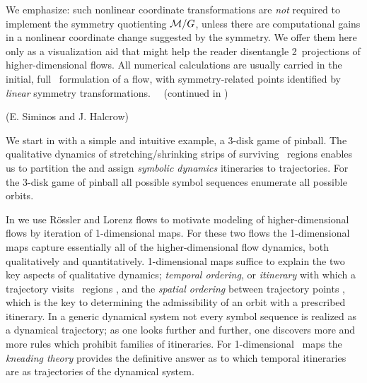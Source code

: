 {We emphasize: such nonlinear coordinate transformations are
\emph{not} required to implement the symmetry quotienting
${\cal M}/G$, unless there are computational gains in a nonlinear
coordinate change suggested by the symmetry. We offer them here
only as a visualization aid that might help the reader
disentangle 2\dmn\ projections of higher-dimensional flows. All
numerical calculations are usually carried in the initial, full
\statesp\ formulation of a flow, with symmetry-related points
identified by \emph{linear} symmetry transformations.
~~(continued in )

\hfill   (E. Siminos and J. Halcrow)
    } %





We start in  with a simple and intuitive
example, a 3-disk game of pinball. The qualitative dynamics of
stretching/shrinking strips of surviving \statesp\ regions
enables us to partition the {\statesp} and  assign
\emph{symbolic dynamics} itineraries to trajectories. For the
3-disk game of pinball all possible symbol sequences enumerate
all possible orbits.

In  we use R\"ossler and Lorenz flows to
motivate modeling of higher-dimensional flows by iteration of
1-dimensional maps. For these two flows the 1-dimensional maps
capture essentially all of the higher-dimensional flow
dynamics, both qualitatively and quantitatively. 1-dimensional
maps suffice to explain the two key aspects of qualitative
dynamics; \emph{temporal ordering}, or \emph{itinerary} with
which a trajectory visits \statesp\ regions%
, and the \emph{spatial ordering}
between trajectory points %
, which is the
key to determining the admissibility of an orbit with a
prescribed itinerary. In a generic dynamical system not every
symbol sequence is realized as a dynamical trajectory; as one
looks further and further, one discovers more and more rules
which prohibit families of itineraries. For 1-dimensional
\stretchf\ maps the \emph{kneading theory} %
provides the definitive answer as to which temporal itineraries
are {\em \admissible} as trajectories of the dynamical system.



